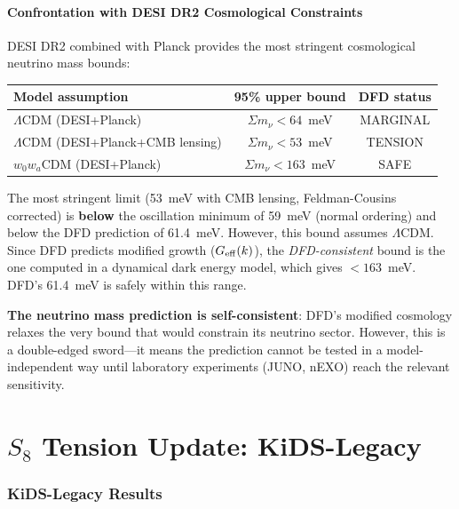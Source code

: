\documentclass[11pt,a4paper]{article}
\begin{document}
\subsection{Confrontation with DESI DR2 Cosmological Constraints}

DESI DR2 combined with Planck provides the most stringent cosmological
neutrino mass bounds:

\begin{center}
\begin{tabular}{lcc}
\toprule
Model assumption & 95\% upper bound & DFD status \\
\midrule
$\Lambda$CDM (DESI+Planck) & $\Sigma m_\nu < 64$~meV & MARGINAL \\
$\Lambda$CDM (DESI+Planck+CMB lensing) & $\Sigma m_\nu < 53$~meV &
  TENSION \\
$w_0 w_a$CDM (DESI+Planck) & $\Sigma m_\nu < 163$~meV & SAFE \\
\bottomrule
\end{tabular}
\end{center}

The most stringent limit (53~meV with CMB lensing, Feldman-Cousins
corrected) is \textbf{below} the oscillation minimum of 59~meV (normal
ordering) and below the DFD prediction of 61.4~meV. However, this bound
assumes $\Lambda$CDM. Since DFD predicts modified growth
($G_{\rm eff}(k)$), the \emph{DFD-consistent} bound is the one computed
in a dynamical dark energy model, which gives $< 163$~meV. DFD's
61.4~meV is safely within this range.

\textbf{The neutrino mass prediction is self-consistent}: DFD's modified
cosmology relaxes the very bound that would constrain its neutrino
sector. However, this is a double-edged sword---it means the prediction
cannot be tested in a model-independent way until laboratory experiments
(JUNO, nEXO) reach the relevant sensitivity.


\part{$S_8$ Tension Update: KiDS-Legacy}
\label{part:s8}

\section{KiDS-Legacy Results}
\end{document}
